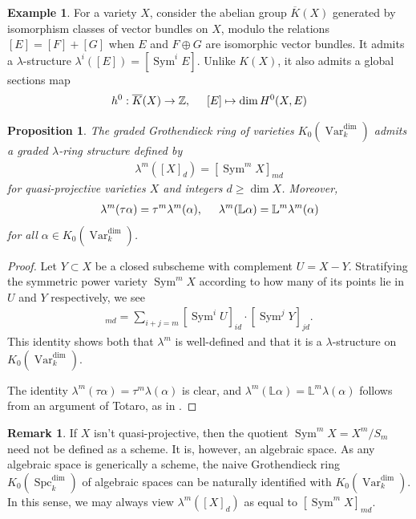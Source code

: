 \documentclass{amsart}
\newtheorem{prop}[thm]{Proposition}
\theoremstyle{definition}
\newtheorem{exmp}[thm]{Example}
\newtheorem{rmk}[thm]{Remark}
\DeclareMathOperator{\Sym}{Sym}
\DeclareMathOperator{\Var}{Var}
\DeclareMathOperator{\Spc}{Spc}
\newcommand{\Kdim}{K_0(\Var_k^{\dim})}
\numberwithin{equation}{section}
\begin{document}
\begin{exmp}\label{K bar}
For a variety $X$, consider the abelian group $\overline{K}(X)$ generated by isomorphism classes of vector bundles on $X$, modulo the relations $[E] = [F] + [G]$ when $E$ and $F \oplus G$ are isomorphic vector bundles. It admits a $\lambda$-structure $\lambda^i([E]) = [\Sym^i E]$. Unlike $K(X)$, it also admits a global sections map
\begin{align*}
    h^0: \overline{K}(X) \rightarrow \mathbb{Z}, \hspace{.5cm} [E] \mapsto \dim H^0(X, E)
\end{align*}
\end{exmp}

\begin{prop}\label{K0 lambda defn}
The graded Grothendieck ring of varieties $\Kdim$ admits a graded $\lambda$-ring structure defined by
\begin{align*}
    \lambda^m([X]_d) = [\Sym^m X]_{md}
\end{align*}
for quasi-projective varieties $X$ and integers $d \geq \dim X$. Moreover, 
\begin{align*}
    \lambda^m(\tau \alpha) = \tau^m \lambda^m(\alpha), \hspace{.5cm} \lambda^m(\mathbb{L} \alpha) = \mathbb{L}^m \lambda^m(\alpha)
\end{align*}
for all $\alpha \in \Kdim$.
\end{prop}

\begin{proof}
Let $Y \subset X$ be a closed subscheme with complement $U = X - Y$. Stratifying the symmetric power variety $\Sym^m X$ according to how many of its points lie in $U$ and $Y$ respectively, we see
\begin{align*}
    [\Sym^m X]_{md} = \sum_{i+j=m} [\Sym^i U]_{id} \cdot [\Sym^j Y]_{jd}. 
\end{align*}
This identity shows both that $\lambda^m$ is well-defined and that it is a $\lambda$-structure on $\Kdim$. 

The identity $\lambda^m(\tau \alpha) = \tau^m \lambda(\alpha)$ is clear, and $\lambda^m(\mathbb{L} \alpha) = \mathbb{L}^m \lambda(\alpha)$ follows from an argument of Totaro, as in \cite[Lemma $4.4$]{gottschehilbert}.
\end{proof}

\begin{rmk}
If $X$ isn't quasi-projective, then the quotient $\Sym^m X = X^m / S_m$ need not be defined as a scheme. It is, however, an algebraic space. As any algebraic space is generically a scheme, the naive Grothendieck ring $K_0(\Spc_k^{\dim})$ of algebraic spaces can be naturally identified with $\Kdim$. In this sense, we may always view $\lambda^m([X]_d)$ as equal to $[\Sym^m X]_{md}$.
\end{rmk}
\end{document}

